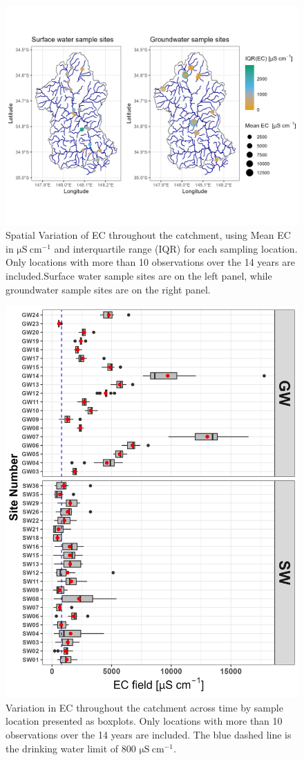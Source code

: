 \documentclass[, manuscript]{copernicus}
\begin{document}
\begin{figure}
\includegraphics[width=1\linewidth]{Figures/ec_map} \caption{Spatial Variation of EC throughout the catchment, using Mean EC in $\mathrm{\mu S~cm^{-1}}$ and interquartile range (IQR) for each sampling location. Only locations with more than 10 observations over the 14 years are included.Surface water sample sites are on the left panel, while groundwater sample sites are on the right panel. }\label{fig:ECmap}
\end{figure}

\clearpage

\begin{figure}
\includegraphics[width=0.8\linewidth]{Figures/ec_plot} \caption{Variation in EC throughout the catchment across time by sample location presented as boxplots. Only locations with more than 10 observations over the 14 years are included. The blue dashed line is the drinking water limit of 800 $\mathrm{\mu S~cm^{-1}}$.}\label{fig:ECboxplot}
\end{figure}
\end{document}
